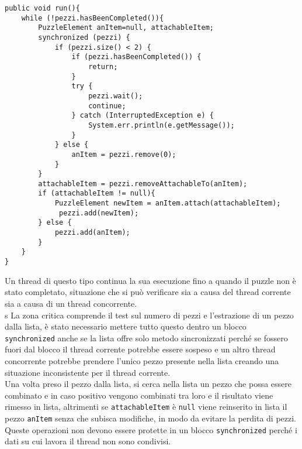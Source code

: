 \documentclass[a4paper, 11pt]{article}
\newcommand{\Null}{\texttt{null}\xspace}
\newcommand{\sync}{\texttt{synchronized}\xspace}
\begin{document}
\begin{lstlisting}
public void run(){
    while (!pezzi.hasBeenCompleted()){
        PuzzleElement anItem=null, attachableItem;
        synchronized (pezzi) {
            if (pezzi.size() < 2) {
                if (pezzi.hasBeenCompleted()) {
                    return;
                }
                try {
                    pezzi.wait();
                    continue;
                } catch (InterruptedException e) {
                    System.err.println(e.getMessage());
                }
            } else {
                anItem = pezzi.remove(0);
            }
        }
        attachableItem = pezzi.removeAttachableTo(anItem);
        if (attachableItem != null){
            PuzzleElement newItem = anItem.attach(attachableItem);
             pezzi.add(newItem);
        } else {
            pezzi.add(anItem);
        }
    }
}
\end{lstlisting}
Un thread di questo tipo continua la sua esecuzione fino a quando il puzzle non è stato completato, situazione che si può verificare sia a causa del thread corrente sia a causa di un thread concorrente. \\s
La zona critica comprende il test sul numero di pezzi e l'estrazione di un pezzo dalla lista, è stato necessario mettere tutto questo dentro un blocco \sync anche se la lista offre solo metodo sincronizzati perché se fossero fuori dal blocco il thread corrente potrebbe essere sospeso e un altro thread concorrente potrebbe prendere l'unico pezzo presente nella lista creando una situazione inconsistente per il thread corrente. \\
Una volta preso il pezzo dalla lista, si cerca nella lista un pezzo che possa essere combinato e in caso positivo vengono combinati tra loro e il risultato viene rimesso in lista, altrimenti se \texttt{attachableItem} è \Null viene reinserito in lista il pezzo \texttt{anItem} senza che subisca modifiche, in modo da evitare la perdita di pezzi. \\
Queste operazioni non devono essere protette in un blocco \sync perché i dati su cui lavora il thread non sono condivisi.
\end{document}

